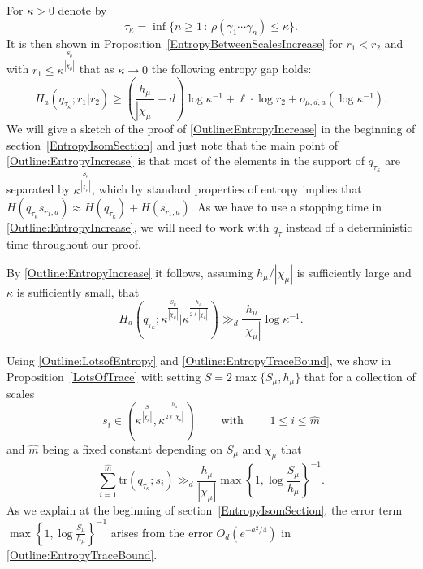 \documentclass[10pt, english,oneside,reqno]{amsart}
\theoremstyle{plain}
\theoremstyle{remark}
\numberwithin{equation}{section}
\numberwithin{figure}{section}
\begin{document}
For $\kappa > 0$ denote by $$\tau_{\kappa} = \inf\{ n \geq 1\,:\, \rho(\gamma_1\cdots \gamma_n) \leq \kappa \}.$$ It is then shown in Proposition~\ref{EntropyBetweenScalesIncrease} for $r_1 < r_2$ and with $r_1 \leq \kappa^{\frac{S_{\mu}}{|\chi_{\mu}|}}$  that as $\kappa \to 0$ the following entropy gap holds:
\begin{equation}\label{Outline:EntropyIncrease}
    H_a(q_{\tau_{\kappa}}; r_1|r_2) \geq \left( \frac{h_{\mu}}{|\chi_{\mu}|} - d \right)\log \kappa^{-1} +  \ell \cdot \log r_2 + o_{\mu,d,a}(\log \kappa^{-1}).
\end{equation}
We will give a sketch of the proof of \eqref{Outline:EntropyIncrease} in the beginning of section~\ref{EntropyIsomSection} and just note that the main point of \eqref{Outline:EntropyIncrease} is that most of the elements in the support of $q_{\tau_{\kappa}}$ are separated by $\kappa^{\frac{S_{\mu}}{|\chi_{\mu}|}}$, which by standard properties of entropy implies that $H(q_{\tau_{\kappa}}s_{r_1,a}) \approx H(q_{\tau_{\kappa}}) + H(s_{r_1,a})$. As we have to use a stopping time in \eqref{Outline:EntropyIncrease}, we will need to work with $q_{\tau}$ instead of a deterministic time throughout our proof.

By \eqref{Outline:EntropyIncrease} it follows, assuming $h_{\mu}/|\chi_{\mu}|$ is sufficiently large and $\kappa$ is sufficiently small, that 
\begin{equation}\label{Outline:LotsofEntropy}
    H_{a}(q_{\tau_{\kappa}}; \kappa^{\frac{S_{\mu}}{|\chi_{\mu}|}}| \kappa^{\frac{h_{\mu}}{2\ell|\chi_{\mu}|}}) \gg_d \frac{h_{\mu}}{|\chi_{\mu}|} \log \kappa^{-1}.
\end{equation}

Using \eqref{Outline:LotsofEntropy} and \eqref{Outline:EntropyTraceBound}, we show in Proposition~\ref{LotsOfTrace} with setting $S = 2\max\{ S_{\mu}, h_{\mu} \}$ that for a collection of scales $$s_i \in (\kappa^{\frac{S}{|\chi_{\mu}|}},\kappa^{\frac{h_{\mu}}{2\ell|\chi_{\mu}|}}) \quad\quad \text{ with } \quad\quad 1 \leq i \leq \hat{m}$$ and $\hat{m}$ being a fixed constant depending on $S_{\mu}$ and $\chi_{\mu}$ that 
\begin{equation}\label{Outline:LotsofTrace}
    \sum_{i = 1}^{\hat{m}} \mathrm{tr}(q_{\tau_{\kappa}}; s_i) \gg_d \frac{h_{\mu}}{|\chi_{\mu}|}  \max\left\{ 1,\log \frac{S_{\mu}}{h_{\mu}}  \right\}^{-1}.
\end{equation}
As we explain at the beginning of section~\ref{EntropyIsomSection}, the error term $\max\left\{ 1,\log \frac{S_{\mu}}{h_{\mu}}  \right\}^{-1}$ arises from the error $O_d(e^{-a^2/4})$ in \eqref{Outline:EntropyTraceBound}.
\end{document}
